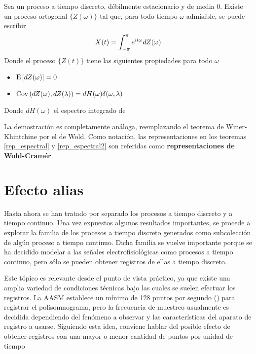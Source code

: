 \begin{teorema}
Sea \xt un proceso a tiempo discreto, débilmente estacionario y de media 0. Existe un proceso ortogonal $\{Z(\omega)\}$ tal que, para todo tiempo $\omega$ admisible, se puede escribir
\begin{equation*}
X(t) = \int_{-\pi}^{\pi} e^{i t \omega} dZ(\omega)
\end{equation*}
Donde el proceso $\{Z(t)\}$ tiene las siguientes propiedades para todo $\omega$
\begin{itemize}
\item $\mathrm{E}\left[ dZ(\omega) \right] = 0$
\item $\mathrm{Cov}\left( dZ(\omega),dZ(\lambda) \right) = dH(\omega) \delta(\omega, \lambda)$
\end{itemize}
Donde $dH(\omega)$ el espectro integrado de \xt
\label{rep_espectral2}
\end{teorema}

La demostración es completamente análoga, reemplazando el teorema de Winer-Khintchine por el de Wold. Como notación, las representaciones en los teoremas \ref{rep_espectral} y \ref{rep_espectral2} son referidas como \textbf{representaciones de Wold-Cramér}.


\section{Efecto {alias}}

Hasta ahora se han tratado por separado los procesos a tiempo discreto y a tiempo continuo. 
%
Una vez expuestos algunos resultados importantes, se procede a explorar la familia de los procesos a tiempo discreto generados como subcolección de algún proceso a tiempo continuo. 
%
Dicha familia se vuelve importante porque se ha decidido modelar a las señales electrofisiológicas como procesos a tiempo continuo, pero sólo se pueden obtener registros de ellas a tiempo discreto.

%
Este tópico es relevante desde el punto de vista práctico, ya que existe una amplia variedad de condiciones técnicas bajo las cuales se suelen efectuar los registros. La AASM establece un mínimo de 128 puntos por segundo (\hz) para registrar el polisomnograma, pero la frecuencia de muestreo usualmente es decidida dependiendo del fenómeno a observar y las características del aparato de registro a usarse.
%
Siguiendo esta idea, conviene hablar del posible efecto de obtener registros con una mayor o menor cantidad de puntos por unidad de tiempo

